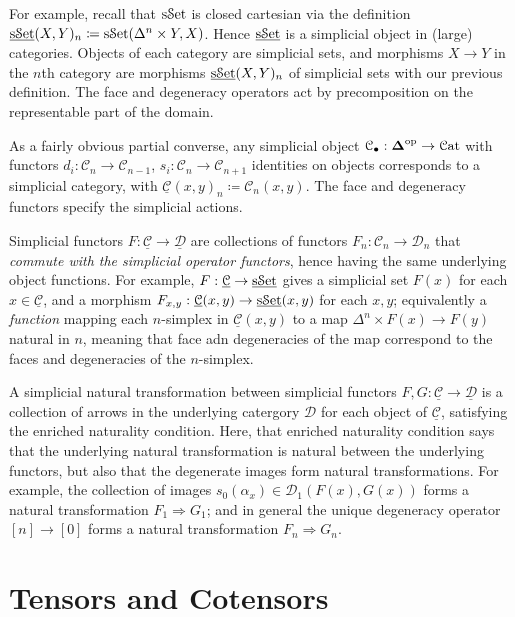 For example, recall that $\mathrm{s}\mathcal{S}\mathrm{et}$ is closed cartesian via the definition $\underline{\mathrm{s}\mathcal{S}\mathrm{et}} (X,Y)_n\coloneqq \mathrm{s}\mathcal{S}\mathrm{et}(\Delta^n \times Y,X)$. Hence $\underline{\mathrm{s}\mathcal{S}\mathrm{et}} $ is a simplicial object in (large) categories. Objects of each category are simplicial sets, and morphisms $X\to Y$ in the $n$th category are morphisms $\underline{\mathrm{s}\mathcal{S}\mathrm{et}} (X,Y)_n$ of simplicial sets with our previous definition. The face and degeneracy operators act by precomposition on the representable part of the domain.

As a fairly obvious partial converse, any simplicial object $\mathcal{C} _{\bullet} : \boldsymbol{\Delta} ^{\mathrm{op}}  \to \mathcal{C}\mathrm{at}$ with functors $d_i : \mathcal{C} _n \to \mathcal{C} _{n-1} $, $s_i : \mathcal{C} _n \to \mathcal{C} _{n+1} $ identities on objects corresponds to a simplicial category, with $\underline{\mathcal{C} } (x,y)_n\coloneqq \mathcal{C}_n(x,y)$. The face and degeneracy functors specify the simplicial actions.

Simplicial functors $F : \underline{\mathcal{C} }  \to \underline{\mathcal{D} } $ are collections of functors $F_n : \mathcal{C} _n \to \mathcal{D} _n$ that \emph{commute with the simplicial operator functors}, hence having the same underlying object functions. For example, $F : \underline{\mathcal{C} }  \to \underline{\mathrm{s}\mathcal{S}\mathrm{et}} $ gives a simplicial set $F(x)$ for each $x\in\underline{\mathcal{C} } $, and a morphism $F_{x,y} : \underline{\mathcal{C} } (x,y) \to \underline{\mathrm{s}\mathcal{S}\mathrm{et}} (x,y)$ for each $x,y$; equivalently a \emph{function} mapping each $n$-simplex in $\underline{\mathcal{C} } (x,y)$ to a map $\Delta^n \times F(x)\to F(y)$ natural in $n$, meaning that face adn degeneracies of the map correspond to the faces and degeneracies of the $n$-simplex.

A simplicial natural transformation between simplicial functors $F,G : \underline{\mathcal{C} }  \to \underline{\mathcal{D} } $ is a collection of arrows in the underlying catergory $\mathcal{D} $ for each object of $\underline{\mathcal{C} } $, satisfying the enriched naturality condition. Here, that enriched naturality condition says that the underlying natural transformation is natural between the underlying functors, but also that the degenerate images form natural transformations. For example, the collection of images $s_0(\alpha_x)\in \mathcal{D} _1(F(x),G(x))$ forms a natural transformation $F_1\Rightarrow G_1$; and in general the unique degeneracy operator $[n]\to [0]$ forms a natural transformation $F_n\Rightarrow G_n$.

\section{Tensors and Cotensors}

